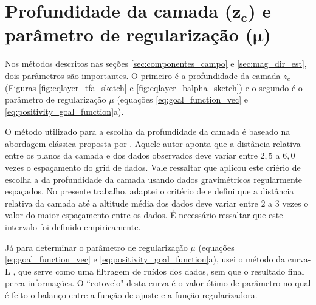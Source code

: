 \section{Profundidade da camada ($\mathbf{z_{c}}$) e parâmetro de regularização ($\mathbf{\mu}$)}

Nos métodos descritos nas seções \ref{sec:componentes_campo} e \ref{sec:mag_dir_est}, 
dois parâmetros são importantes. O primeiro é a profundidade da camada $z_{c}$ (Figuras \ref{fig:eqlayer_tfa_sketch} e 
\ref{fig:eqlayer_balpha_sketch}) e o segundo é o parâmetro de regularização $\mu$ 
(equações \ref{eq:goal_function_vec} e \ref{eq:positivity_goal_function}a). 

O método utilizado para a escolha da profundidade da camada é baseado na abordagem clássica proposta por 
\cite{dampney1969}. Aquele autor aponta que a distância relativa entre os planos da camada e dos dados 
observados deve variar entre $2,5$ a $6,0$ vezes o espaçamento do grid de dados. Vale ressaltar que 
\cite{dampney1969} aplicou este criério de escolha a da profundidade da camada usando dados gravimétricos 
regularmente espaçados. No presente trabalho, adaptei o critério de \cite{dampney1969} e defini que a 
distância relativa da camada até a altitude média dos dados deve variar entre $2$ a $3$ vezes o valor do 
maior espaçamento entre os dados. É necessário ressaltar que este intervalo foi definido empiricamente. 

Já para determinar o parâmetro de regularização $\mu$ (equações \ref{eq:goal_function_vec} e 
\ref{eq:positivity_goal_function}a), usei o método da curva-L \citep{hansen-oleary1993}, que serve como 
uma filtragem de ruídos dos dados, sem que o resultado final perca informações. O ``cotovelo" desta curva é 
o valor ótimo de parâmetro no qual é feito o balanço entre a função de ajuste e a função regularizadora. 